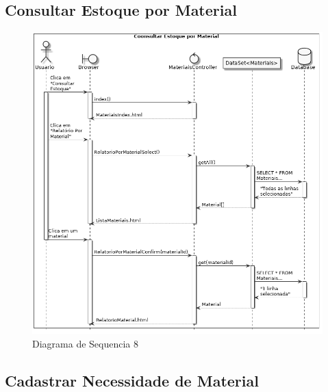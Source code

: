 \documentclass[rascunho,xindy,acronym,symbols]{fei}
\begin{document}
\subsection{Consultar Estoque por Material}

\begin{figure}[H]
    \centering
    \includegraphics[width=\textwidth]{./Images/DS_Consultar_Estoque_Material.png}
    \caption{Diagrama de Sequencia 8}
    \label{fig:diag_seq8}
\end{figure}

\subsection{Cadastrar Necessidade de Material}
\end{document}
